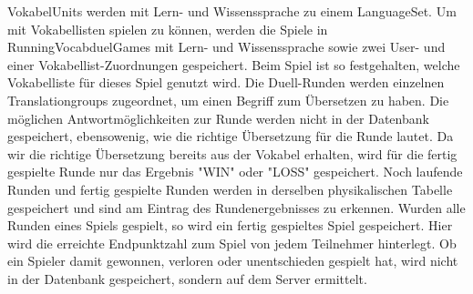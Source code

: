 VokabelUnits werden mit Lern- und Wissenssprache zu einem LanguageSet.
Um mit Vokabellisten spielen zu können, werden die Spiele in RunningVocabduelGames mit Lern- und Wissenssprache sowie zwei User- und einer Vokabellist-Zuordnungen gespeichert.
Beim Spiel ist so festgehalten, welche Vokabelliste für dieses Spiel genutzt wird. Die Duell-Runden werden einzelnen Translationgroups zugeordnet, um einen Begriff zum Übersetzen zu haben.
Die möglichen Antwortmöglichkeiten zur Runde werden nicht in der Datenbank gespeichert, ebensowenig, wie die richtige Übersetzung für die Runde lautet.
Da wir die richtige Übersetzung bereits aus der Vokabel erhalten, wird für die fertig gespielte Runde nur das Ergebnis "WIN" oder "LOSS" gespeichert.
Noch laufende Runden und fertig gespielte Runden werden in derselben physikalischen Tabelle gespeichert und sind am Eintrag des Rundenergebnisses zu erkennen.
Wurden alle Runden eines Spiels gespielt, so wird ein fertig gespieltes Spiel gespeichert. Hier wird die erreichte Endpunktzahl zum Spiel von jedem Teilnehmer hinterlegt.
Ob ein Spieler damit gewonnen, verloren oder unentschieden gespielt hat, wird nicht in der Datenbank gespeichert, sondern auf dem Server ermittelt.
